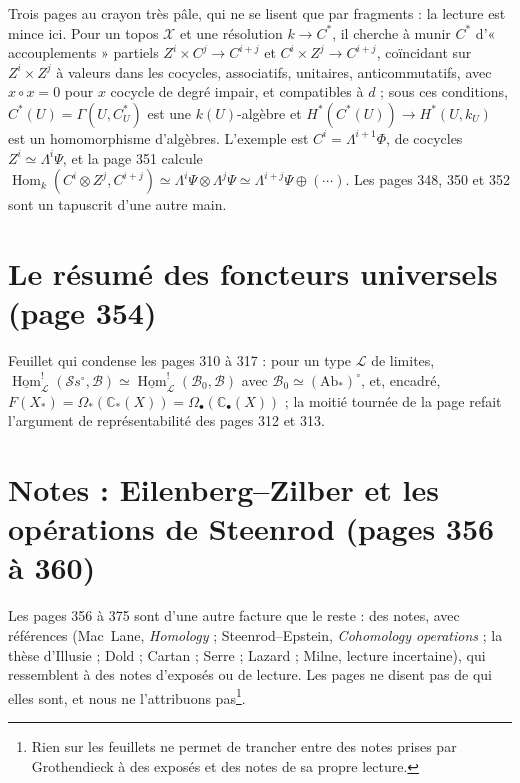 \documentclass[11pt,a4paper]{article}
\begin{document}
Trois pages au crayon très pâle, qui ne se lisent que par fragments : la lecture
est mince ici. Pour un topos $\mathcal{X}$ et une résolution $k \to C^*$, il
cherche à munir $C^*$ d'« accouplements » partiels $Z^i \times C^j \to C^{i+j}$
et $C^i \times Z^j \to C^{i+j}$, coïncidant sur $Z^i \times Z^j$ à valeurs dans
les cocycles, associatifs, unitaires, anticommutatifs, avec $x \circ x = 0$
pour $x$ cocycle de degré impair, et compatibles à $d$ ; sous ces conditions,
$C^*(U) = \Gamma(U, C^*_U)$ est une $k(U)$-algèbre et $H^*(C^*(U)) \to H^*(U,
k_U)$ est un homomorphisme d'algèbres. L'exemple est $C^i = \Lambda^{i+1}\Phi$,
de cocycles $Z^i \simeq \Lambda^i\Psi$, et la page 351 calcule
$\operatorname{Hom}_k(C^i \otimes Z^j, C^{i+j}) \simeq \Lambda^i\Psi \otimes
\Lambda^j\Psi \simeq \Lambda^{i+j}\Psi \oplus (\cdots)$. Les pages 348, 350 et
352 sont un tapuscrit d'une autre main.

\section*{Le résumé des foncteurs universels (page 354)}

Feuillet qui condense les pages 310 à 317 : pour un type $\mathcal{L}$ de
limites, $\underline{\operatorname{Hom}}^!_{\mathcal{L}}(\mathcal{S}s^\circ,
\mathcal{B}) \simeq \underline{\operatorname{Hom}}^!_{\mathcal{L}}(\mathcal{B}_0,
\mathcal{B})$ avec $\mathcal{B}_0 \simeq (\mathrm{Ab}_*)^\circ$, et, encadré,
$F(X_*) = \Omega_*(\mathbb{C}_*(X)) = \Omega_\bullet(\mathbb{C}_\bullet(X))$ ;
la moitié tournée de la page refait l'argument de représentabilité des pages 312
et 313.

\section*{Notes : Eilenberg--Zilber et les opérations de Steenrod (pages 356 à 360)}

Les pages 356 à 375 sont d'une autre facture que le reste : des notes, avec
références (Mac~Lane, \emph{Homology} ; Steenrod–Epstein, \emph{Cohomology
operations} ; la thèse d'Illusie ; Dold ; Cartan ; Serre ; Lazard ; Milne,
lecture incertaine), qui ressemblent à des notes d'exposés ou de lecture. Les
pages ne disent pas de qui elles sont, et nous ne l'attribuons
pas\footnote{Rien sur les feuillets ne permet de trancher entre des notes
prises par Grothendieck à des exposés et des notes de sa propre lecture.}.
\end{document}

